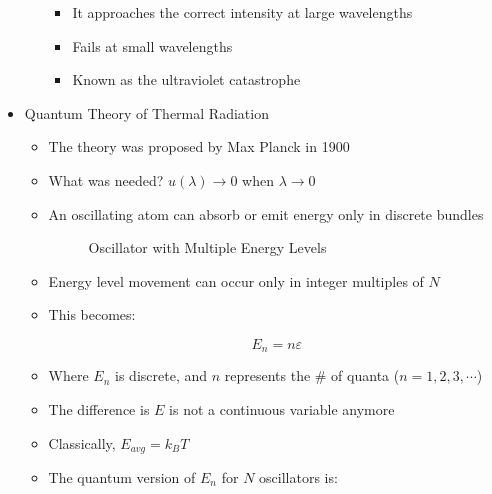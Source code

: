 \begin{itemize}
\begin{itemize}
        \begin{itemize}

          \item It approaches the correct intensity at large wavelengths

          \item Fails at small wavelengths

          \item Known as the ultraviolet catastrophe

        \end{itemize}

    \end{itemize}

  \item Quantum Theory of Thermal Radiation

    \begin{itemize}

      \item The theory was proposed by Max Planck in 1900

      \item What was needed? $u(\lambda)\to 0$ when $\lambda \to 0$

      \item An oscillating atom can absorb or emit energy only in discrete bundles

        \begin{figure}[h!]
          \centering
          
          \caption{Oscillator with Multiple Energy Levels}
          \label{fig:4}
        \end{figure}

      \item Energy level movement can occur only in integer multiples of $N$

      \item This becomes:

        $$\boxed{E_n=n\varepsilon}$$

      \item Where $E_n$ is discrete, and $n$ represents the \# of quanta ($n=1,2,3,\cdots$)

      \item The difference is $E$ is not a continuous variable anymore

      \item Classically, $E_{avg}=k_BT$

      \item The quantum version of $E_n$ for $N$ oscillators is: 


\end{itemize}
\end{itemize}
